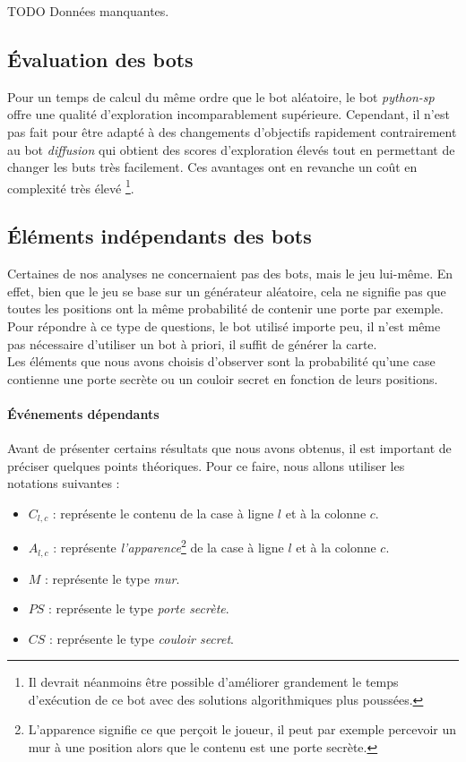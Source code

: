\documentclass[a4paper,12pt]{article}
\begin{document}
TODO Données manquantes.

\subsection{Évaluation des bots}
Pour un temps de calcul du même ordre que le bot aléatoire, le bot
{\em python-sp} offre une qualité d'exploration incomparablement supérieure.
Cependant, il n'est pas fait pour être adapté à des changements d'objectifs
rapidement contrairement au bot {\em diffusion} qui obtient des scores
d'exploration élevés tout en permettant de changer les buts très facilement. Ces
avantages ont en revanche un coût en complexité très élevé \footnote{ Il devrait
néanmoins être possible d'améliorer grandement le temps d'exécution de ce bot
avec des solutions algorithmiques plus poussées.}.

\subsection{Éléments indépendants des bots}
Certaines de nos analyses ne concernaient pas des bots, mais le jeu lui-même. En
effet, bien que le jeu se base sur un générateur aléatoire, cela ne signifie pas
que toutes les positions ont la même probabilité de contenir une porte par
exemple. Pour répondre à ce type de questions, le bot utilisé importe peu, il
n'est même pas nécessaire d'utiliser un bot à priori, il suffit de générer la
carte.
\\
Les éléments que nous avons choisis d'observer sont la probabilité qu'une case
contienne une porte secrète ou un couloir secret en fonction de leurs positions.

\paragraph{Événements dépendants}
Avant de présenter certains résultats que nous avons obtenus, il est important
de préciser quelques points théoriques. Pour ce faire, nous allons utiliser les
notations suivantes :
\begin{itemize}
\item $C_{l,c}$ :
  représente le contenu de la case à ligne $l$ et à la colonne $c$.
\item $A_{l,c}$ :
  représente {\em l'apparence}\footnote{L'apparence signifie ce que perçoit le
    joueur, il peut par exemple percevoir un mur à une position alors que le
    contenu est une porte secrète.} de la case à ligne $l$ et à la colonne $c$.
\item $M$ :
  représente le type {\em mur}.
\item $PS$ :
  représente le type {\em porte secrète}.
\item $CS$ :
  représente le type {\em couloir secret}.
\end{itemize}
\end{document}
